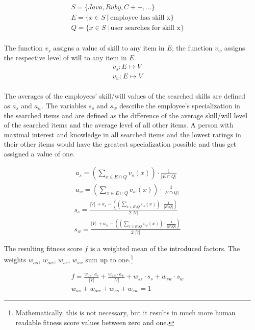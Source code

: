 \begin{gather*}
  S = \{Java, Ruby, C++, ...\} \\
  E = \{x \in S \ | \ \textrm{employee has skill x}\} \\
  Q = \{x \in S \ | \ \textrm{user searches for skill x}\} \\
\end{gather*}

\newpage

The function $v_s$ assigns a value of skill to any item in $E$; the function $v_w$ assigns the respective level of will to any item in $E$.
\begin{gather*}
  v_s: E \mapsto V \\
  v_w: E \mapsto V \\
\end{gather*}

The averages of the employees' skill/will values of the searched skills are defined as $a_s$ and $a_w$.
The variables $s_s$ and $s_w$ describe the employee's specialization in the searched items and are defined as the difference
of the average skill/will level of the searched items and the average level of all other items.
A person with maximal interest and knowledge in all searched items and the lowest ratings in their other items would have the greatest specialization possible and thus get assigned a value of one.

\begin{gather*}
  a_s = \left( \sum_{x \in E \cap Q} v_s(x) \right) \cdot \frac{1}{|E \cap Q|} \\
  a_w = \left( \sum_{x \in E \cap Q} v_w(x) \right) \cdot \frac{1}{|E \cap Q|}
\end{gather*}
\begin{gather*}
  s_s = \frac{|V| \ + a_s - \left( \left( \sum_{x \in E \setminus Q} v_s(x)\right) \cdot \frac{1}{|E \setminus Q|} \right)}{2 \ |V|}\\
  s_w = \frac{|V| \ + a_w - \left( \left( \sum_{x \in E \setminus Q} v_w(x)\right) \cdot \frac{1}{|E \setminus Q|} \right)}{2 \ |V|}
\end{gather*}

The resulting fitness score $f$ is a weighted mean of the introduced factors. The weights $w_{as}$, $w_{aw}$, $w_{ss}$, $w_{sw}$ sum up to one.\footnote{Mathematically, this is not necessary, but it results in much more human readable fitness score values between zero and one.}

\begin{gather*}
  f = \frac{w_{as} \cdot a_s}{|V|} + \frac{w_{aw} \cdot a_w}{|V|} + w_{ss} \cdot s_s + w_{sw} \cdot s_w \\
  w_{as} + w_{aw} + w_{ss} + w_{sw} = 1
\end{gather*}

